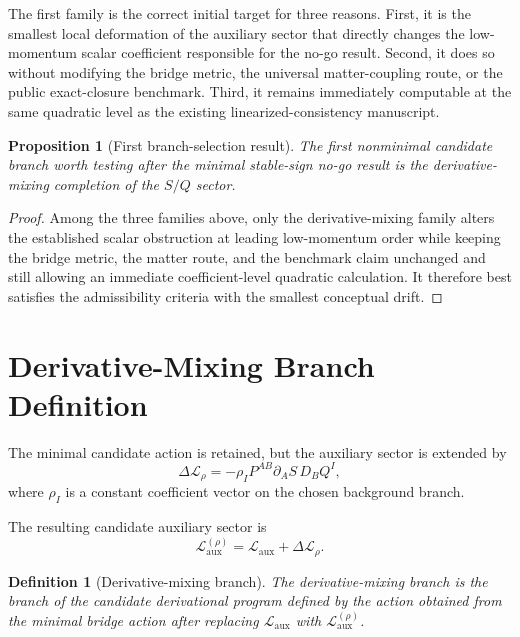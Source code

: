 \documentclass[11pt]{article}
\newtheorem{definition}{Definition}
\newtheorem{proposition}{Proposition}
\begin{document}
The first family is the correct initial target for three reasons. First, it is the smallest local deformation of the auxiliary sector that directly changes the low-momentum scalar coefficient responsible for the no-go result. Second, it does so without modifying the bridge metric, the universal matter-coupling route, or the public exact-closure benchmark. Third, it remains immediately computable at the same quadratic level as the existing linearized-consistency manuscript.

\begin{proposition}[First branch-selection result]
The first nonminimal candidate branch worth testing after the minimal stable-sign no-go result is the derivative-mixing completion of the \(S/Q\) sector.
\end{proposition}

\begin{proof}
Among the three families above, only the derivative-mixing family alters the established scalar obstruction at leading low-momentum order while keeping the bridge metric, the matter route, and the benchmark claim unchanged and still allowing an immediate coefficient-level quadratic calculation. It therefore best satisfies the admissibility criteria with the smallest conceptual drift.
\end{proof}

\section{Derivative-Mixing Branch Definition}

The minimal candidate action is retained, but the auxiliary sector is extended by
\begin{equation}
\Delta\mathcal L_{\rho}
=
-\rho_I P^{AB}\partial_A S\,D_BQ^I,
\label{eq:Lrho}
\end{equation}
where \(\rho_I\) is a constant coefficient vector on the chosen background branch.

The resulting candidate auxiliary sector is
\begin{equation}
\mathcal L_{\mathrm{aux}}^{(\rho)}
=
\mathcal L_{\mathrm{aux}}
+\Delta\mathcal L_{\rho}.
\label{eq:Lauxrho}
\end{equation}

\begin{definition}[Derivative-mixing branch]
The derivative-mixing branch is the branch of the candidate derivational program defined by the action obtained from the minimal bridge action after replacing \(\mathcal L_{\mathrm{aux}}\) with \(\mathcal L_{\mathrm{aux}}^{(\rho)}\).
\end{definition}
\end{document}
